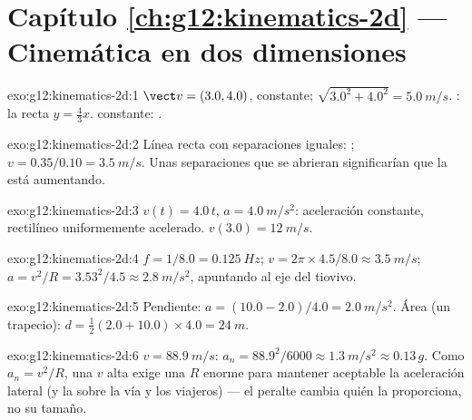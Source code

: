 \section*{Capítulo \ref{ch:g12:kinematics-2d} --- Cinemática en dos dimensiones}

\begin{solution}{exo:g12:kinematics-2d:1}
$\vect v = (3.0, 4.0)$, constante; 
$\sqrt{3.0^2 + 4.0^2} = \qty{5.0}{m/s}$. : la recta
$y = \tfrac43 x$.  constante: .
\end{solution}

\begin{solution}{exo:g12:kinematics-2d:2}
Línea recta con separaciones iguales: ;
$v = 0.35/0.10 = \qty{3.5}{m/s}$. Unas separaciones que se abrieran
significarían que la  está aumentando.
\end{solution}

\begin{solution}{exo:g12:kinematics-2d:3}
$v(t) = 4.0\,t$, $a = \qty{4.0}{m/s^2}$: aceleración constante,
rectilíneo uniformemente acelerado. $v(3.0) = \qty{12}{m/s}$.
\end{solution}

\begin{solution}{exo:g12:kinematics-2d:4}
$f = 1/8.0 = \qty{0.125}{Hz}$;
$v = 2\pi \times 4.5/8.0 \approx \qty{3.5}{m/s}$;
$a = v^2/R = 3.53^2/4.5 \approx \qty{2.8}{m/s^2}$, apuntando al eje del
tiovivo.
\end{solution}

\begin{solution}{exo:g12:kinematics-2d:5}
Pendiente: $a = (10.0 - 2.0)/4.0 = \qty{2.0}{m/s^2}$. Área (un
trapecio): $d = \tfrac12 (2.0 + 10.0) \times 4.0 = \qty{24}{m}$.
\end{solution}

\begin{solution}{exo:g12:kinematics-2d:6}
$v = \qty{88.9}{m/s}$:
$a_n = 88.9^2/6000 \approx \qty{1.3}{m/s^2} \approx 0.13\,g$. Como
$a_n = v^2/R$, una $v$ alta exige una $R$ enorme para mantener aceptable
la aceleración lateral (y la  sobre la vía y los viajeros) --- el
peralte cambia quién la proporciona, no su tamaño.
\end{solution}

